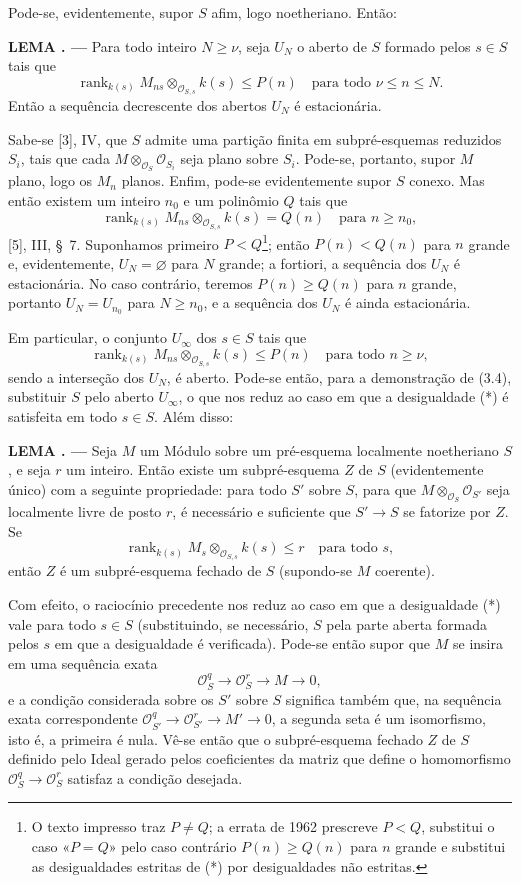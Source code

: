 \documentclass[11pt,twoside,openany]{book}
\numberwithin{equation}{section}
\newcommand{\src}[1]{%
  \phantomsection\hypertarget{src:#1}{}%
  \marginpar{\raggedleft\footnotesize\sffamily #1}%
}
\theoremstyle{plain}
\theoremstyle{definition}
\theoremstyle{remark}
\newcommand{\result}[2]{%
  \par\medskip\noindent\textbf{#1%
  \if\relax\detokenize{#2}\relax\else\space#2\fi. ---}\enspace
}
\newcommand{\FgaUnitKey}{frontmatter}
\renewcommand{\src}[1]{%
  \phantomsection\hypertarget{src:\FgaUnitKey:#1}{}%
  \marginpar{\raggedleft\footnotesize\sffamily #1}%
}
\begin{document}
Pode-se, evidentemente, supor $S$ afim, logo noetheriano. Então:

\result{LEMA}{3.5} Para todo inteiro $N\geq\nu$, seja $U_N$ o aberto de $S$
formado pelos $s\in S$ tais que
\[
\operatorname{rank}_{k(s)}
M_{ns}\otimes_{\mathcal O_{S,s}}k(s)\leq P(n)
\quad\text{para todo $\nu\leq n\leq N$}.
\]
Então a sequência decrescente dos abertos $U_N$ é estacionária.

Sabe-se [3], IV, que $S$ admite uma partição finita em subpré-esquemas
reduzidos $S_i$, tais que cada
$M\otimes_{\mathcal O_S}\mathcal O_{S_i}$ seja plano sobre $S_i$. Pode-se,
portanto, supor $M$ plano, logo os $M_n$ planos. Enfim, pode-se evidentemente
supor $S$ conexo. Mas então existem um inteiro $n_0$ e um polinômio $Q$ tais
que
\[
\operatorname{rank}_{k(s)}
M_{ns}\otimes_{\mathcal O_{S,s}}k(s)=Q(n)
\quad\text{para $n\geq n_0$},
\]
[5], III, \S~7. Suponhamos primeiro $P<Q$\footnote{O texto impresso traz
$P\neq Q$; a errata de 1962 prescreve $P<Q$, substitui o caso «$P=Q$» pelo
caso contrário $P(n)\geq Q(n)$ para $n$ grande e substitui as desigualdades
estritas de (*) por desigualdades não estritas.}; então $P(n)<Q(n)$ para $n$
grande e, evidentemente, $U_N=\varnothing$ para $N$ grande; a fortiori, a
sequência dos $U_N$ é estacionária. No caso contrário, teremos
$P(n)\geq Q(n)$ para $n$ grande, portanto $U_N=U_{n_0}$ para $N\geq n_0$, e
a sequência dos $U_N$ é ainda estacionária.

Em particular, o conjunto $U_\infty$ dos $s\in S$ tais que
\[
\tag{*}
\operatorname{rank}_{k(s)}
M_{ns}\otimes_{\mathcal O_{S,s}}k(s)\leq P(n)
\quad\text{para todo $n\geq\nu$},
\]
sendo a interseção dos $U_N$, é aberto. Pode-se então, para a demonstração de
(3.4), substituir $S$ pelo aberto $U_\infty$, o que nos reduz ao caso em que a
desigualdade (*) é satisfeita em todo $s\in S$. Além disso:

\result{LEMA}{3.6} Seja $M$ um Módulo sobre um pré-esquema localmente
noetheriano $S$, e seja $r$ um inteiro. Então existe um subpré-esquema $Z$ de
$S$ (evidentemente único) com a seguinte propriedade: para todo $S'$ sobre
$S$, para que $M\otimes_{\mathcal O_S}\mathcal O_{S'}$ seja localmente
livre de posto $r$, é necessário e suficiente que $S'\longrightarrow S$ se
fatorize por $Z$. Se
\[
\operatorname{rank}_{k(s)}
M_s\otimes_{\mathcal O_{S,s}}k(s)\leq r
\quad\text{para todo $s$},
\]
então $Z$ é um subpré-esquema fechado de $S$ (supondo-se $M$ coerente).
\src{264}
Com efeito, o raciocínio precedente nos reduz ao caso em que a desigualdade
(*) vale para todo $s\in S$ (substituindo, se necessário, $S$ pela parte
aberta formada pelos $s$ em que a desigualdade é verificada). Pode-se então
supor que $M$ se insira em uma sequência exata
\[
\mathcal O_S^q\longrightarrow\mathcal O_S^r\longrightarrow M\longrightarrow0,
\]
e a condição considerada sobre os $S'$ sobre $S$ significa também que, na
sequência exata correspondente
$\mathcal O_{S'}^q\longrightarrow\mathcal O_{S'}^r
\longrightarrow M'\longrightarrow0$, a segunda seta é um isomorfismo, isto
é, a primeira é nula. Vê-se então que o subpré-esquema fechado $Z$ de $S$
definido pelo Ideal gerado pelos coeficientes da matriz que define o
homomorfismo $\mathcal O_S^q\longrightarrow\mathcal O_S^r$ satisfaz a
condição desejada.
\end{document}
